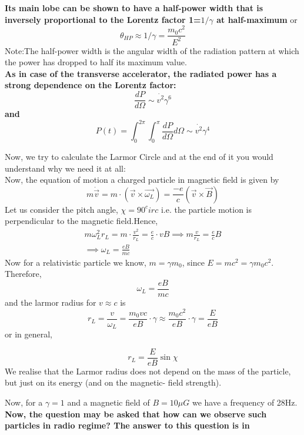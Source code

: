 \documentclass[11pt]{report}
\newcommand{\de}[2]{\frac{d{#1}}{d{#2}}}
\newcommand{\cbox}{tcolorbox}
\newcommand{\vd}[1]{\dot{\vec{#1}}}
\begin{document}
\textbf{Its main lobe can be shown to have a half-power width that is inversely proportional to the Lorentz factor 1=$1/\gamma$ at half-maximum} or 
\begin{equation}
\theta_{HP}\approx 1/\gamma =\frac{m_0c^2}{E^2}
\end{equation}
Note:The half-power width is the angular width of the radiation  pattern at which the power has dropped to half its maximum value.\\
\textbf{As in case of the transverse accelerator, the radiated power has a strong dependence on the Lorentz factor:
\begin{equation}
\de{P}{\Omega} \sim \dot{v^2}\gamma^6
\end{equation}
and
\begin{equation}
P(t)=\int^{2 \pi} _{0}\int^{ \pi} _{0} \de{P}{\Omega} d\Omega \sim \dot{v^2}\gamma^4
\end{equation}
}

Now, we try to calculate the Larmor Circle and at the end of it you would understand why we need it at all:\\
Now, the equation of motion a charged particle in magnetic field is given by
\begin{equation}
m\vd{v}=m\cdot (\vec{v}\times \vec{\omega_L})=\frac{-e}{c}(\vec{v}\times \vec{B})
\end{equation}
Let us consider the pitch angle, $\chi=90^circ$ i.e. the particle motion is perpendicular to the magnetic field.Hence,
\begin{eqnarray}
m\omega^2_Lr_L=m\cdot \frac{v^2}{r_L}=\frac{e}{c} \cdot vB
\implies m\frac{v}{r_L}=\frac{e}{c} B\\
\implies \omega_L=\frac{eB}{mc}
\end{eqnarray}
Now for a relativistic particle we know, $m=\gamma m_0$, since $E=mc^2=\gamma m_0c^2$. Therefore,
\begin{equation}
\omega_L=\frac{eB}{mc}
\end{equation}
and the larmor radius for $v\approx c$ is
\begin{equation}
r_L=\frac{v}{\omega_L}=\frac{m_0vc}{eB}\cdot \gamma\approx \frac{m_0c^2}{eB}\cdot \gamma =\frac{E}{eB}
\end{equation}
or in general,
\begin{\cbox}
\begin{equation}
r_L=\frac{E}{eB}\sin \chi
\end{equation}
We realise that the Larmor radius does not depend on the mass of the particle, but just on its energy (and on the magnetic- field strength). 
\end{\cbox}
Now, for a $\gamma=1$ and a magnetic field of $B=10\mu G$ we have a frequency of 28Hz. 
\textbf{Now, the question may be asked that how can we observe such particles in radio regime? The answer to this question is in}
\end{document}
